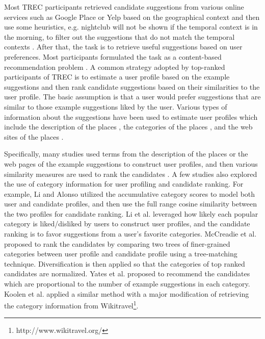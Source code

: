 Most TREC participants retrieved
candidate suggestions from various online services such as 
Google Place %
or Yelp %
based on the geographical context
and then use some heuristics, e.g. nightclub will not be shown if 
the temporal context is in the morning, to filter out the 
suggestions that do not match the temporal contexts 
\cite{adriel:overview, adriel:overview2013}.
After that, the task is to retrieve useful suggestions based on 
user preferences. Most participants formulated the task as a 
content-based recommendation problem 
\cite{irit:treccs2012,georgetown:treccs2012,
udel:treccs2012,udben:treccs2012, isi:treccs2013, up:treccs2013, udel:treccs2014, cmu:treccs2014, bjut:treccs2014, rama:treccs2014, glasgow:treccs2014}. 
A common strategy adopted by top-ranked participants of TREC is to 
estimate a user profile based on the example suggestions and then rank 
candidate suggestions based on their similarities to the user profile. 
The basic assumption is that a user would prefer suggestions that are 
similar to those example suggestions liked by the user.  
Various types of information about the suggestions have been used
to estimate user profiles which include 
the description of the places \cite{udel:treccs2012,irit:treccs2012,up:treccs2013}, 
the categories of the places \cite{rama:treccs2014,bjut:treccs2014,glasgow:treccs2014,
georgetown:treccs2012,uamst:treccs2013},
and the web sites of the places \cite{udel:treccs2012,irit:treccs2012,up:treccs2013}.

Specifically, many studies used terms from the description of the places or 
the web pages of the example suggestions to construct user profiles, 
and then various similarity measures are used to rank the candidates
\cite{udel:treccs2012,irit:treccs2012,up:treccs2013}. 
A few studies also explored the use of category information for user profiling 
and candidate ranking. For example, 
Li and Alonso \cite{rama:treccs2014} utilized the accumulative category 
scores to model both user and candidate profiles, and then use 
the full range cosine similarity between the two profiles for candidate ranking. 
Li et al. \cite{bjut:treccs2014} leveraged how likely each popular category is 
liked/disliked by users to construct user profiles, and the candidate ranking is 
to favor suggestions from a user's favorite categories. 
McCreadie et al. \cite{glasgow:treccs2014} proposed to rank the 
candidates by comparing two trees of finer-grained categories between 
user profile and candidate profile using a tree-matching technique. 
Diversification is then applied so that the categories of top ranked 
candidates are normalized.
Yates et al. \cite{georgetown:treccs2012} proposed to 
recommend the candidates which are proportional to the number of 
example suggestions in each category.
Koolen et al. \cite{uamst:treccs2013} applied a similar method 
with a major modification of 
retrieving the category information from Wikitravel\footnote{http://www.wikitravel.org/}.

